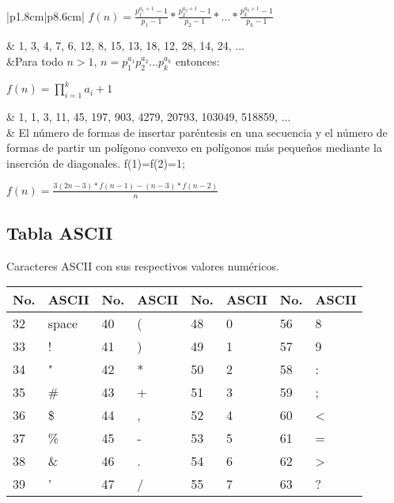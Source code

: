 \documentclass[10pt,landscape,twocolumn,letterpaper,twosided]{article}
\begin{document}
{{\begin{center}
{\begin{supertabular}{|p{1.8cm}|p{8.6cm}|}
						$f(n) = \displaystyle\frac{p_{1}^{a_{1} + 1} - 1}{p_{1} - 1} * \frac{p_{2}^{a_{2} + 1} - 1}{p_{2} - 1}
						* ... * \frac{p_{k}^{a_{k} + 1} - 1}{p_{k} - 1}$ 
						\\ \hline

						& 1, 3, 4, 7, 6, 12, 8, 15, 13, 18, 12, 28, 14, 24, ...
						\\ 
						&Para todo $n>1$, 
						$n=\displaystyle p_{1}^{\textstyle a_{1}}\displaystyle p_{2}^{\textstyle a_{2}}...
						\displaystyle p_{k}^{\textstyle a_{k}}$ entonces:

						$f(n) = \prod_{i=1}^{k} a_{i}+1$
						\\ \hline

						& 1, 1, 3, 11, 45, 197, 903, 4279, 20793, 103049, 518859, ...
						\\  
						& El número de formas de insertar paréntesis en una secuencia y el número de formas de partir un
						polígono convexo en polígonos más pequeños mediante la inserción de diagonales. f(1)=f(2)=1;

						$f(n) = \displaystyle\frac{3(2n-3)*f(n-1) - (n-3)*f(n-2)}{n}$
						\\ \hline

					\end{supertabular}
					}
				\end{center}		
		
		\subsection{Tabla ASCII}
			Caracteres ASCII con sus respectivos valores numéricos.
			\begin{table}[H]
				\begin{tabular}{|l|l|l|l|l|l|l|l|}
					\hline \textbf{No.} & \textbf{ASCII} & \textbf{No.} & \textbf{ASCII}  &
						\textbf{No.} & \textbf{ASCII} & \textbf{No.} & \textbf{ASCII} \\ \hline
					32 & space & 40 & ( & 48 & 0 & 56 & 8 \\ \hline
					33 &  ! & 41 & ) & 49 & 1 & 57 & 9 \\ \hline
					34 &  " & 42 & * & 50 & 2 & 58 & : \\ \hline
					35 & \# & 43 & + & 51 & 3 & 59 & ; \\ \hline
					36 & \$ & 44 & , & 52 & 4 & 60 & < \\ \hline
					37 & \% & 45 & - & 53 & 5 & 61 & = \\ \hline
					38 & \& & 46 & . & 54 & 6 & 62 & > \\ \hline
					39 &  ' & 47 & / & 55 & 7 & 63 & ? \\ \hline
				\end{tabular}
			\end{table}
		
}}
\end{document}
